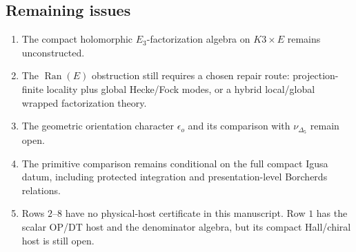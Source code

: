 \subsection{Remaining issues}

\begin{enumerate}
\item The compact holomorphic \(E_3\)-factorization algebra on
\(K3\times E\) remains unconstructed.
\item The \(\operatorname{Ran}(E)\) obstruction still requires a chosen
repair route: projection-finite locality plus global Hecke/Fock modes,
or a hybrid local/global wrapped factorization theory.
\item The geometric orientation character \(\epsilon_o\) and its
comparison with \(\nu_{\Delta_5}\) remain open.
\item The primitive comparison remains conditional on the full compact
Igusa datum, including protected integration and presentation-level
Borcherds relations.
\item Rows \(2\)--\(8\) have no physical-host certificate in this
manuscript.  Row \(1\) has the scalar OP/DT host and the denominator
algebra, but its compact Hall/chiral host is still open.
\end{enumerate}
